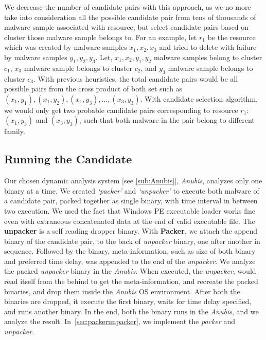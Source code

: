 We decrease the number of candidate pairs with this approach, as we no more take into consideration all the possible candidate pair from tens of thousands of malware sample associated with resource, but select candidate pairs based on cluster those malware sample belongs to.
For an example, let $r_1$ be the resource which was created by malware samples $x_1,x_2,x_3$ and tried to delete with failure by malware samples $y_1, y_2, y_3$.
Let, $x_1,x_2,y_1,y_2$ malware samples belong to cluster $c_1$, $x_3$ malware sample belongs to cluster $c_2$, and $y_3$ malware sample belongs to cluster $c_3$.
With previous heuristics, the total candidate pairs would be all possible pairs from the cross product of both set such as $(x_1,y_1), (x_1,y_2), (x_1,y_3),\ldots ,(x_3, y_3)$.
With candidate selection algorithm, we would only get two probable candidate pairs corresponding to resource $r_1$: $(x_1,y_3)$ and $(x_3,y_3)$, such that both malware in the pair belong to different family.
\subsection{Running the Candidate}
\label{sub:Running the Candidate}
Our chosen dynamic analysis system [see \autoref{sub:Anubis}], \emph{Anubis}, analyzes only one binary at a time.
We created \emph{`packer'} and \emph{`unpacker'} to execute both malware of a candidate pair, packed together as single binary, with time interval in between two execution.
We used the fact that Windows PE executable loader works fine even with extraneous concatenated data at the end of valid executable file.
The \textbf{unpacker} is a self reading dropper binary.
With \textbf{Packer}, we attach the append binary of the candidate pair, to the back of \emph{unpacker} binary, one after another in sequence.
Followed by the binary, meta-information, such as size of both binary and preferred time delay, was appended to the end of the \emph{unpacker}.
We analyze the packed \emph{unpacker} binary in the \emph{Anubis}.
When executed, the \emph{unpacker}, would read itself from the behind to get the meta-information, and recreate the packed binaries, and drop them inside the \emph{Anubis} OS environment.
After both the binaries are dropped, it execute the first binary, waits for time delay specified, and runs another binary.
In the end, both the binary runs in the \emph{Anubis}, and we analyze the result.
In~\autoref{sec:packerunpacker}, we implement the \emph{packer} and \emph{unpacker}.
